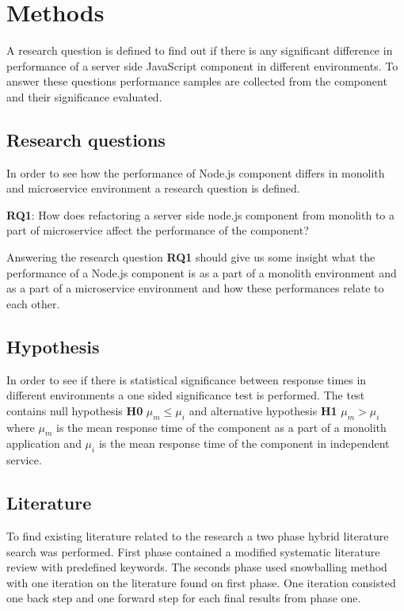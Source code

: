 \chapter{Methods\label{methods}}
A research question is defined to find out if there is any significant difference in performance of a server side JavaScript component in different environments.
To answer these questions performance samples are collected from the component and their significance evaluated.

\section{Research questions}
In order to see how the performance of Node.js component differs in monolith and microservice environment a research question is defined.

\textbf{RQ1}: How does refactoring a server side node.js component from monolith to a part of microservice affect the performance of the component?

Answering the research question \textbf{RQ1} should give us some insight what the performance of a Node.js component is as a part of a monolith environment and as a part of a microservice environment and how these performances relate to each other.

\section{Hypothesis}
In order to see if there is statistical significance between response times in different environments a one sided significance test is performed.
The test contains null hypothesis \textbf{H0} $\mu_m\le\mu_i$ and alternative hypothesis \textbf{H1} $\mu_m>\mu_i$ where $\mu_m$ is the mean response time of the component as a part of a monolith application and $\mu_i$ is the mean response time of the component in independent service.

\section{Literature}
To find existing literature related to the research a two phase hybrid literature search was performed.
First phase contained a modified systematic literature review with predefined keywords.
The seconds phase used snowballing method with one iteration on the literature found on first phase.
One iteration consisted one back step and one forward step for each final results from phase one.

